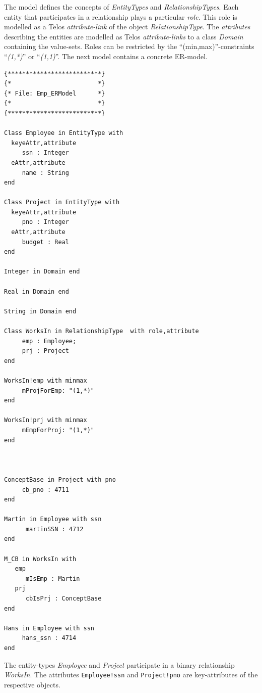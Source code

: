 The model defines the concepts of {\em EntityTypes} and
{\em RelationshipTypes}.
Each entity that participates in a relationship plays a
particular {\em role}.
This role is modelled as a Telos {\em attribute-link} of the
object {\em RelationshipType}.
The {\em attributes} describing the entities are modelled
as Telos {\em attribute-links}
to a class {\em Domain} containing the value-sets. Roles
can be restricted by
the ``(min,max)''-constraints ``{\em (1,*)}'' or ``{\em (1,1)}''.
The next model contains a concrete ER-model.

{\small
\begin{verbatim}
{**************************}
{*                        *}
{* File: Emp_ERModel      *}
{*                        *}
{**************************}

Class Employee in EntityType with
  keyeAttr,attribute
     ssn : Integer
  eAttr,attribute
     name : String
end

Class Project in EntityType with
  keyeAttr,attribute
     pno : Integer
  eAttr,attribute
     budget : Real
end

Integer in Domain end

Real in Domain end

String in Domain end

Class WorksIn in RelationshipType  with role,attribute
     emp : Employee;
     prj : Project
end

WorksIn!emp with minmax
     mProjForEmp: "(1,*)"
end

WorksIn!prj with minmax
     mEmpForProj: "(1,*)"
end



ConceptBase in Project with pno
     cb_pno : 4711
end

Martin in Employee with ssn
      martinSSN : 4712
end

M_CB in WorksIn with
   emp
      mIsEmp : Martin
   prj
      cbIsPrj : ConceptBase
end

Hans in Employee with ssn
     hans_ssn : 4714
end
\end{verbatim}
}

The entity-types {\em Employee} and {\em Project} participate in a
binary relationship {\em WorksIn}. The attributes {\tt Employee!ssn}
and {\tt Project!pno} are key-attributes of the respective objects.

